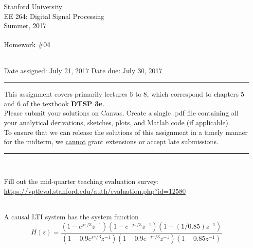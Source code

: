 \documentclass[12pt]{report}
\begin{document}
\thispagestyle{empty}
\begin{centering}
	{\large Stanford University}\\
	{\large EE 264: Digital Signal Processing}\\
	{\large Summer, 2017} \\
	\mbox{}\\
	{\large Homework \#04}\\
	\mbox{}\\
\end{centering}
\noindent Date assigned:  July 21, 2017 \hfill
Date due: July 30, 2017\\
\noindent \rule{6.5 in}{0.5pt}
  This assignment covers primarily lectures 6 to 8, which correspond to chapters 5 and 6 of the textbook {\bf DTSP 3e}. \\
  Please submit your solutions on Canvas. Create a single .pdf file containing all your analytical derivations, sketches, plots, and Matlab code (if applicable). \\
  To ensure that we can release the solutions of this assignment in a timely manner for the midterm, we \underline{cannot} grant extensions or accept late submissions.

\noindent
\rule{6.5 in}{0.5pt}
\mbox{}\\


Fill out the mid-quarter teaching evaluation survey:
 \url{https://vptleval.stanford.edu/auth/evaluation.php?id=12580}
 
\mbox{}\\ 
A causal LTI system has the system function
\begin{equation}
H(z) = \frac{(1-e^{j\pi/3} z^{-1})(1-e^{-j\pi/3}z^{-1})(1+(1/0.85)z^{-1})}{(1-0.9e^{j\pi/3} z^{-1})(1-0.9e^{-j\pi/3}z^{-1})(1+0.85z^{-1})}
\end{equation}
\end{document}
